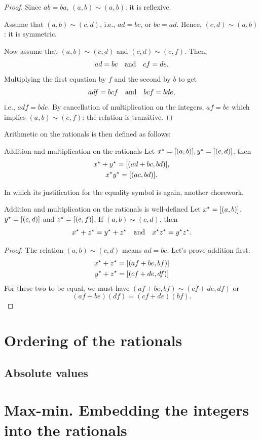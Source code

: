 \begin{proof}
  Since \(ab = ba\), \((a, b) \sim (a, b)\): it is reflexive.

  Assume that \((a, b) \sim (c, d)\), i.e., \(ad = bc\), or \(bc = ad\). Hence,
  \((c, d) \sim (a, b)\): it is symmetric.

  Now assume that \((a, b) \sim (c, d)\) and \((c, d) \sim (e, f)\). Then,
  \begin{equation}
    ad = bc \quad\textrm{and}\quad cf = de.
  \end{equation}
  Multiplying the first equation by \(f\) and the second by \(b\) to get
  \begin{equation}
    adf = bcf \quad\textrm{and}\quad bcf = bde,
  \end{equation}
  i.e., \(adf = bde\). By cancellation of multiplication on the integers, \(af = be\)
  which implies \((a, b) \sim (e, f)\): the relation is transitive.
\end{proof}

Arithmetic on the rationals is then defined as follows:

\begin{df}{Addition and multiplication on the rationals}{}
  Let \(x^{\star} = [(a, b)], y^{\star} = [(c, d)]\), then
  \begin{gather}
    x^{\star} + y^{\star} = [(ad + bc, bd)], \\
    x^{\star}y^{\star} = [(ac, bd)].
  \end{gather}
\end{df}

In which its justification for the equality symbol is again, another chorework.

\begin{prop}{Addition and multiplication on the rationals is well-defined}{}
  Let \(x^{\star} = [(a, b)]\), \(y^{\star} = [(c, d)]\) and \(z^{\star} = [(e, f)]\). If
  \((a, b) \sim (c, d)\), then
  \begin{equation}
    x^{\star} + z^{\star} = y^{\star} + z^{\star} \quad\textrm{and}\quad x^{\star}z^{\star} = y^{\star}z^{\star}.
  \end{equation}
\end{prop}

\begin{proof}
  The relation \((a, b) \sim (c, d)\) means \(ad = bc\). Let's prove addition first.
  \begin{multline}
    x^{\star} + z^{\star} = [(af + be, bf)] \\
    y^{\star} + z^{\star} = [(cf + de, df)]
  \end{multline}
  For these two to be equal, we must have \((af + be, bf) \sim (cf + de, df)\) or
  \begin{equation}
    (af + be)(df) = (cf + de)(bf).
  \end{equation}
\end{proof}

\section{Ordering of the rationals}

\subsection{Absolute values}

\section{Max-min. Embedding the integers into the rationals}
